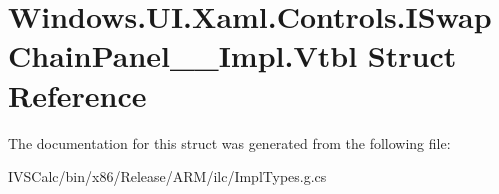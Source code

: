 \hypertarget{struct_windows_1_1_u_i_1_1_xaml_1_1_controls_1_1_i_swap_chain_panel_____impl_1_1_vtbl}{}\section{Windows.\+U\+I.\+Xaml.\+Controls.\+I\+Swap\+Chain\+Panel\+\_\+\+\_\+\+Impl.\+Vtbl Struct Reference}
\label{struct_windows_1_1_u_i_1_1_xaml_1_1_controls_1_1_i_swap_chain_panel_____impl_1_1_vtbl}


The documentation for this struct was generated from the following file\+:\begin{DoxyCompactItemize}
\item 
I\+V\+S\+Calc/bin/x86/\+Release/\+A\+R\+M/ilc/Impl\+Types.\+g.\+cs\end{DoxyCompactItemize}
